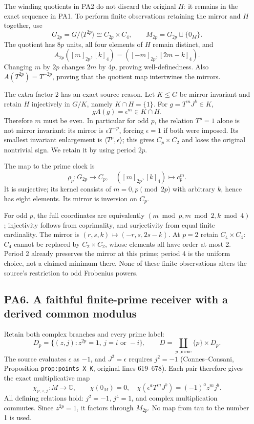 The winding quotients in PA2 do not discard the original \(H\): it remains in the exact sequence in PA1. To perform finite observations retaining the mirror and \(H\) together, use \[
G_{2p}=G/\langle T^{2p}\rangle\cong C_{2p}\times C_4,
\qquad M_{2p}=G_{2p}\sqcup\{0_M\}.
\] The quotient has \(8p\) units, all four elements of \(H\) remain distinct, and \[
A_{2p}([m]_{2p},[k]_4)=([-m]_{2p},[2m-k]_4).
\] Changing \(m\) by \(2p\) changes \(2m\) by \(4p\), proving well-definedness. Also \(A(T^{2p})=T^{-2p}\), proving that the quotient map intertwines the mirrors.

The extra factor 2 has an exact source reason. Let \(K\le G\) be mirror invariant and retain \(H\) injectively in \(G/K\), namely \(K\cap H=\{1\}\). For \(g=T^mJ^k\in K\), \[
gA(g)=\epsilon^m\in K\cap H.
\] Therefore \(m\) must be even. In particular for odd \(p\), the relation \(T^p=1\) alone is not mirror invariant: its mirror is \(\epsilon T^{-p}\), forcing \(\epsilon=1\) if both were imposed. Its smallest invariant enlargement is \(\langle T^p,\epsilon\rangle\); this gives \(C_p\times C_2\) and loses the original nontrivial sign. We retain it by using period \(2p\).

The map to the prime clock is \[
\rho_p:G_{2p}\to C_p,\quad ([m]_{2p},[k]_4)\mapsto c_p^m.
\] It is surjective; its kernel consists of \(m=0,p\pmod{2p}\) with arbitrary \(k\), hence has eight elements. Its mirror is inversion on \(C_p\).

For odd \(p\), the full coordinates are equivalently \((m\bmod p,m\bmod2,k\bmod4)\); injectivity follows from coprimality, and surjectivity from equal finite cardinality. The mirror is \((r,s,k)\mapsto(-r,s,2s-k)\). At \(p=2\) retain \(C_4\times C_4\): \(C_4\) cannot be replaced by \(C_2\times C_2\), whose elements all have order at most 2. Period 2 already preserves the mirror at this prime; period 4 is the uniform choice, not a claimed minimum there. None of these finite observations alters the source's restriction to odd Frobenius powers.

\subsection{PA6. A faithful finite-prime receiver with a derived common modulus}\label{pa20260924-pa6.-a-faithful-finite-prime-receiver-with-a-derived-common-modulus}

Retain both complex branches and every prime label: \[
D_p=\{(z,j):z^{2p}=1,\ j=i\text{ or }-i\},
\qquad D=\coprod_{p\text{ prime}}\{p\}\times D_p.
\] The source evaluates \(\epsilon\) as \(-1\), and \(J^2=\epsilon\) requires \(j^2=-1\) (Connes--Consani, Proposition \texttt{prop:points\_X\_K}, original lines 619--678). Each pair therefore gives the exact multiplicative map \[
\chi_{p,z,j}:M\to\mathbb C,\qquad
\chi(0_M)=0,\quad
\chi(\epsilon^aT^mJ^b)=(-1)^az^mj^b.
\] All defining relations hold: \(j^2=-1\), \(j^4=1\), and complex multiplication commutes. Since \(z^{2p}=1\), it factors through \(M_{2p}\). No map from tau to the number 1 is used.

